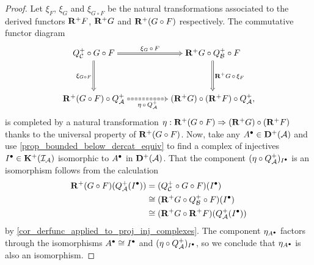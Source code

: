 \begin{proof}
  Let $\xi_F$, $\xi_G$ and $\xi_{G \circ F}$ be the natural
  transformations associated to the derived functors
  $\rightderfunc[+]{F}$, $\rightderfunc[+]{G}$ and
  $\rightderfunc[+]{(G \circ F)}$ respectively.
  The commutative functor diagram
  \[
    \begin{tikzcd}[cramped]
      {Q_{\abcat{C}}^+ \circ G \circ F} && {\rightderfunc[+]{G} \circ
      Q_{\abcat{B}}^+ \circ F} \\
      \\
      {\rightderfunc[+]{(G \circ F)} \circ Q_{\abcat{A}}^+} &&
      {(\rightderfunc[+]{G}) \circ (\rightderfunc[+]{F}) \circ Q_{\abcat{A}}^+},
      \arrow["{\xi_G \, \circ \, F}", Rightarrow, from=1-1, to=1-3]
      \arrow["{\xi_{G \circ F}}"', Rightarrow, from=1-1, to=3-1]
      \arrow["{\rightderfunc[+]{G} \, \circ \, \xi_F}", Rightarrow,
      from=1-3, to=3-3]
      \arrow["{\eta \, \circ \, Q_{\abcat{A}}^+}"', Rightarrow,
      dashed, from=3-1, to=3-3]
    \end{tikzcd}
  \]
  is completed by a natural transformation $\eta: \rightderfunc[+]{(G
  \circ F)} \nattrans (\rightderfunc[+]{G}) \circ
  (\rightderfunc[+]{F})$ thanks to the universal property of
  $\rightderfunc[+]{(G \circ F)}$.
  Now, take any $\cochaincomp{A} \in \dercat[+]{\abcat{A}}$ and use
  \cref{prop_bounded_below_dercat_equiv} to find a complex of
  injectives $\cochaincomp{I} \in \homcat[+]{\cat{I}_{\abcat{A}}}$
  isomorphic to $\cochaincomp{A}$ in $\dercat[+]{\abcat{A}}$.
  That the component $(\eta \circ Q_{\abcat{A}}^+)_{\cochaincomp{I}}$
  is an isomorphism follows from the calculation
  \begin{align*}
    \rightderfunc[+]{(G \circ F)(\dercatlocln[+]{\abcat{A}}(\cochaincomp{I}))}
    &= (\dercatlocln[+]{\abcat{C}} \circ G \circ F)(\cochaincomp{I}) \\
    &\cong (\rightderfunc[+]{G} \circ \dercatlocln[+]{\abcat{B}}
    \circ F)(\cochaincomp{I}) \\
    &\cong (\rightderfunc[+]{G} \circ
    \rightderfunc[+]{F})(\dercatlocln[+]{\abcat{A}}(\cochaincomp{I}))
  \end{align*}
  by \cref{cor_derfunc_applied_to_proj_inj_complexes}.
  The component $\eta_{\cochaincomp{A}}$ factors through the
  isomorphisms $\cochaincomp{A} \cong \cochaincomp{I}$ and $(\eta
  \circ Q_{\abcat{A}}^+)_{\cochaincomp{I}}$, so we conclude that
  $\eta_{\cochaincomp{A}}$ is also an isomorphism.
\end{proof}


